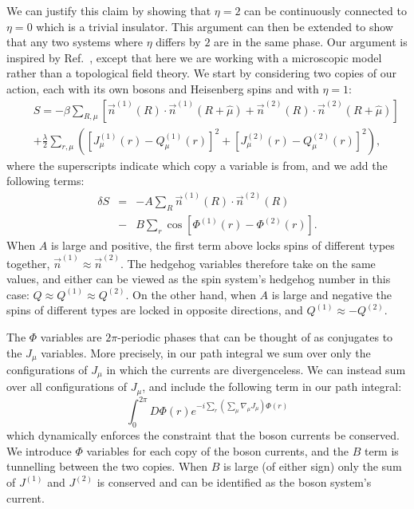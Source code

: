 \documentclass[prb,twocolumn]{revtex4-1}
\begin{document}
We can justify this claim by showing that $\eta=2$ can be continuously connected to $\eta=0$ which is a trivial insulator. This argument can then be extended to show that any two systems where $\eta$ differs by $2$ are in the same phase.  Our argument is inspired by Ref.~, except that here we are working with a microscopic model rather than a topological field theory.
We start by considering two copies of our action, each with its own bosons and Heisenberg spins and with $\eta=1$:
\begin{eqnarray}
&&S=-\beta\sum_{R,\mu}\left[ \vec{n}^{(1)}(R)\cdot \vec{n}^{(1)}(R+\hat{\mu})+\vec{n}^{(2)}(R)\cdot \vec{n}^{(2)}(R+\hat{\mu})\right]\nonumber\\
&&+\frac{\lambda}{2}\sum_{r,\mu}\left( [ J_\mu^{(1)}(r)- Q_\mu^{(1)}(r)]^2+[ J_\mu^{(2)}(r)- Q_\mu^{(2)}(r)]^2\right),
\label{doubleaction}
\end{eqnarray}
where the superscripts indicate which copy a variable is from, and we add the following terms:
\begin{eqnarray}
\delta S&=&-A\sum_{R} \vec{n}^{(1)}(R)\cdot \vec{n}^{(2)}(R)\nonumber\\
&-&B\sum_{r} \cos[\Phi^{(1)}(r)-\Phi^{(2)}(r)].
\label{AB}
\end{eqnarray} 
When $A$ is large and positive, the first term above locks spins of different types together, $\vec{n}^{(1)}\approx\vec{n}^{(2)}$. The hedgehog variables therefore take on the same values, and either can be viewed as the spin system's hedgehog number in this case: $Q \approx Q^{(1)} \approx Q^{(2)}$. On the other hand, when $A$ is large and negative the spins of different types are locked in opposite directions, and $Q^{(1)} \approx -Q^{(2)}$.

The $\Phi$ variables are $2\pi$-periodic phases that can be thought of as conjugates to the $J_\mu$ variables. More precisely, in our path integral we sum over only the configurations of $J_\mu$ in which the currents are divergenceless. We can instead sum over all configurations of $J_\mu$, and include the following term in our path integral:
\begin{equation}
\int_0^{2\pi} D\Phi(r) e^{-i\sum_r (\sum_\mu\nabla_\mu J_\mu)\Phi(r)}
\end{equation}
which dynamically enforces the constraint that the boson currents be conserved. We introduce $\Phi$ variables for each copy of the boson currents, and the $B$ term is tunnelling between the two copies. 
When $B$ is large (of either sign) only the sum of $J^{(1)}$ and $J^{(2)}$ is conserved and can be identified as the boson system's current.
\end{document}
